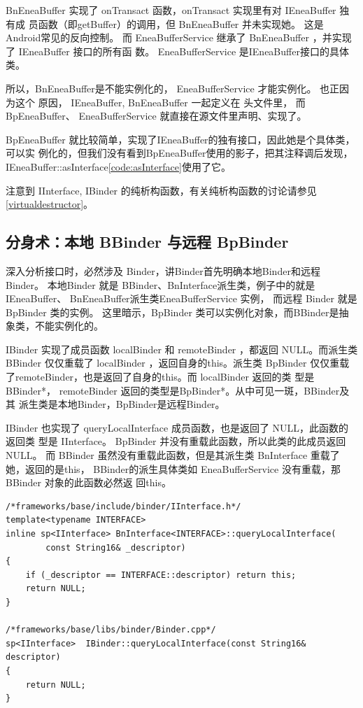\documentclass[a4paper,11pt]{article}
\begin{document}
BnEneaBuffer 实现了 onTransact 函数，onTransact 实现里有对 IEneaBuffer 独有成
员函数（即getBuffer）的调用，但 BnEneaBuffer 并未实现她。 这是Android常见的反向控制。
而 EneaBufferService 继承了 BnEneaBuffer ，并实现了 IEneaBuffer 接口的所有函
数。 EneaBufferService 是IEneaBuffer接口的具体类。

所以，BnEneaBuffer是不能实例化的， EneaBufferService 才能实例化。 也正因为这个
原因， IEneaBuffer, BnEneaBuffer 一起定义在 头文件里， 而 BpEneaBuffer、
EneaBufferService 就直接在源文件里声明、实现了。

BpEneaBuffer 就比较简单，实现了IEneaBuffer的独有接口，因此她是个具体类，可以实
例化的，但我们没有看到BpEneaBuffer使用的影子，把其注释调后发现，
IEneaBuffer::asInterface\autoref{code:asInterface}使用了它。

注意到 IInterface, IBinder 的纯析构函数，有关纯析构函数的讨论请参见
\autoref{virtualdestructor}。

\subsection{分身术：本地 BBinder 与远程 BpBinder}
深入分析接口时，必然涉及 Binder，讲Binder首先明确本地Binder和远程Binder。
本地Binder 就是 BBinder、BnInterface派生类，例子中的就是IEneaBuffer、
BnEneaBuffer派生类EneaBufferService 实例， 而远程 Binder 就是 BpBinder 类的实例。
这里暗示，BpBinder 类可以实例化对象，而BBinder是抽象类，不能实例化的。
\label{binder:LocalOrRemote}

IBinder\cite{BinderCpp} 实现了成员函数 localBinder 和 remoteBinder ，都返回
NULL。而派生类 BBinder 仅仅重载了 localBinder ，返回自身的this。派生类
BpBinder 仅仅重载了remoteBinder，也是返回了自身的this。而 localBinder 返回的类
型是 BBinder*，  remoteBinder 返回的类型是BpBinder*。从中可见一斑，BBinder及其
派生类是本地Binder，BpBinder是远程Binder。

IBinder 也实现了 queryLocalInterface 成员函数，也是返回了 NULL，此函数的返回类
型是 IInterface。 BpBinder 并没有重载此函数，所以此类的此成员返回NULL。 而
BBinder 虽然没有重载此函数，但是其派生类 BnInterface 重载了她，返回的是this，
BBinder的派生具体类如 EneaBufferService 没有重载，那BBinder 对象的此函数必然返
回this。
\begin{lstlisting}[caption=queryLocalInterface 的实现]
/*frameworks/base/include/binder/IInterface.h*/
template<typename INTERFACE>
inline sp<IInterface> BnInterface<INTERFACE>::queryLocalInterface(
        const String16& _descriptor)
{
    if (_descriptor == INTERFACE::descriptor) return this;
    return NULL;
}

/*frameworks/base/libs/binder/Binder.cpp*/
sp<IInterface>  IBinder::queryLocalInterface(const String16& descriptor)
{
    return NULL;
}
\end{lstlisting}
\end{document}
